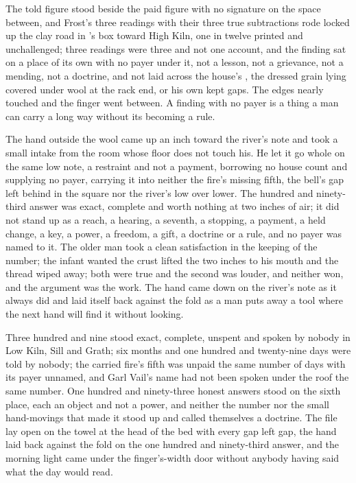 The told figure stood beside the paid figure with no signature on the space between, and Frost's three readings with their three true subtractions rode locked up the clay road in 's box toward High Kiln, one in twelve printed and unchallenged; three readings were three and not one account, and the finding sat on a place of its own with no payer under it, not a lesson, not a grievance, not a mending, not a doctrine, and not laid across the house's , the dressed grain lying covered under wool at the rack end, or his own kept gaps. The edges nearly touched and the finger went between. A finding with no payer is a thing a man can carry a long way without its becoming a rule.

The hand outside the wool came up an inch toward the river's note and took a small intake from the room whose floor does not touch his. He let it go whole on the same low note, a restraint and not a payment, borrowing no house count and supplying no payer, carrying it into neither the fire's missing fifth, the bell's gap left behind in the square nor the river's low over lower. The hundred and ninety-third answer was exact, complete and worth nothing at two inches of air; it did not stand up as a reach, a hearing, a seventh, a stopping, a payment, a held change, a key, a power, a freedom, a gift, a doctrine or a rule, and no payer was named to it. The older man took a clean satisfaction in the keeping of the number; the infant wanted the crust lifted the two inches to his mouth and the thread wiped away; both were true and the second was louder, and neither won, and the argument was the work. The hand came down on the river's note as it always did and laid itself back against the fold as a man puts away a tool where the next hand will find it without looking.

Three hundred and nine stood exact, complete, unspent and spoken by nobody in Low Kiln, Sill and Grath; six months and one hundred and twenty-nine days were told by nobody; the carried fire's fifth was unpaid the same number of days with its payer unnamed, and Garl Vail's name had not been spoken under the roof the same number. One hundred and ninety-three honest answers stood on the sixth place, each an object and not a power, and neither the number nor the small hand-movings that made it stood up and called themselves a doctrine. The file lay open on the towel at the head of the bed with every gap left gap, the hand laid back against the fold on the one hundred and ninety-third answer, and the morning light came under the finger's-width door without anybody having said what the day would read.
